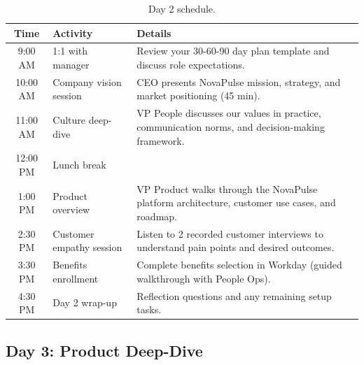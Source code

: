 \documentclass[
    language=english,
    doctype=onboarding-guide,
    institution=none,
]{../../omnilatex}
\begin{document}
\begin{table}[h]
    \centering
    \begin{tabular}{clp{7cm}}
        \toprule
        \textbf{Time} & \textbf{Activity} & \textbf{Details} \\
        \midrule
        9:00 AM  & 1:1 with manager & Review your 30-60-90 day plan template
            and discuss role expectations. \\
        10:00 AM & Company vision session & CEO presents NovaPulse mission,
            strategy, and market positioning (45 min). \\
        11:00 AM & Culture deep-dive & VP People discusses our values in
            practice, communication norms, and decision-making framework. \\
        12:00 PM & Lunch break & \\
        1:00 PM  & Product overview & VP Product walks through the NovaPulse
            platform architecture, customer use cases, and roadmap. \\
        2:30 PM  & Customer empathy session & Listen to 2 recorded customer
            interviews to understand pain points and desired outcomes. \\
        3:30 PM  & Benefits enrollment & Complete benefits selection in Workday
            (guided walkthrough with People Ops). \\
        4:30 PM  & Day 2 wrap-up & Reflection questions and any remaining
            setup tasks. \\
        \bottomrule
    \end{tabular}
    \caption{Day 2 schedule.}
\end{table}

\subsection{Day 3: Product Deep-Dive}
\end{document}
